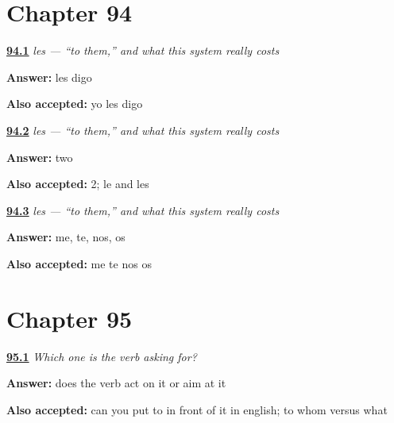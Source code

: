 \section*{Chapter 94}

\noindent\begin{minipage}[t]{\linewidth}
\raggedright
\hyperlink{review-ES-C46-les-say}{\textbf{94.1}} \emph{les — \textquotedblleft{}to them,\textquotedblright{} and what this system really costs}\par
\small \textbf{Answer:} les digo\par
\footnotesize \textbf{Also accepted:} yo les digo
\end{minipage}\par\medskip

\noindent\begin{minipage}[t]{\linewidth}
\raggedright
\hyperlink{review-ES-C46-les-count}{\textbf{94.2}} \emph{les — \textquotedblleft{}to them,\textquotedblright{} and what this system really costs}\par
\small \textbf{Answer:} two\par
\footnotesize \textbf{Also accepted:} 2; le and les
\end{minipage}\par\medskip

\noindent\begin{minipage}[t]{\linewidth}
\raggedright
\hyperlink{review-ES-C46-les-same}{\textbf{94.3}} \emph{les — \textquotedblleft{}to them,\textquotedblright{} and what this system really costs}\par
\small \textbf{Answer:} me, te, nos, os\par
\footnotesize \textbf{Also accepted:} me te nos os
\end{minipage}\par\medskip

\section*{Chapter 95}

\noindent\begin{minipage}[t]{\linewidth}
\raggedright
\hyperlink{review-ES-C46-cual-pide-test}{\textbf{95.1}} \emph{Which one is the verb asking for?}\par
\small \textbf{Answer:} does the verb act on it or aim at it\par
\footnotesize \textbf{Also accepted:} can you put to in front of it in english; to whom versus what
\end{minipage}\par\medskip

